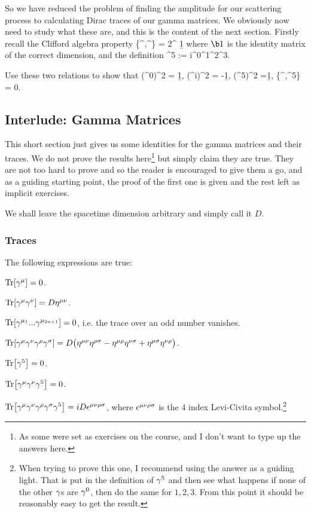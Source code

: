 So we have reduced the problem of finding the amplitude for our scattering process to calculating Dirac traces of our gamma matrices. We obviously now need to study what these are, and this is the content of the next section. Firstly recall the Clifford algebra property
\be 
\label{eqn:AnticommutationGammas}
    \{\g^{\mu},\g^{\nu}\} = 2\eta^{\mu\nu} \b1
\ee 
where $\b1$ is the identity matrix of the correct dimension, and the definition
\be 
\label{eqn:Gamma5}
    \g^5 := i\g^0\g^1\g^2\g^3.
\ee

\bbox 
    Use these two relations to show that 
    \bse 
        \big(\g^0\big)^2 = \b1, \qquad \big(\g^i\big)^2 = -\b1, \qquad \big(\g^5\big)^2 =\b1, \qand \big\{\g^{\mu},\g^5\big\} = 0.
    \ese 
\ebox 


\subsection{Interlude: Gamma Matrices}

This short section just gives us some identities for the gamma matrices and their traces. We do not prove the results here\footnote{As some were set as exercises on the course, and I don't want to type up the answers here.} but simply claim they are true. They are not too hard to prove and so the reader is encouraged to give them a go, and as a guiding starting point, the proof of the first one is given and the rest left as implicit exercises.

We shall leave the spacetime dimension arbitrary and simply call it $D$.

\subsubsection{Traces}

The following expressions are true:
\ben[label=(\roman*)]
    \item $\Tr [\gamma^{\mu}] = 0$.
    \item $\Tr [\gamma^{\mu}\gamma^{\nu}] = D \eta^{\mu\nu}$. 
    \item $\Tr[\gamma^{\mu_1}... \gamma^{\mu_{2n+1}}] = 0$, i.e. the trace over an odd number vanishes. 
    \item $\Tr [\gamma^{\mu}\gamma^{\nu}\gamma^{\rho}\gamma^{\sigma}] = D\big(\eta^{\mu\nu}\eta^{\rho\sigma} - \eta^{\mu\rho}\eta^{\nu\sigma} + \eta^{\mu\sigma}\eta^{\nu\rho}\big)$.
    \item $\Tr[\gamma^5]=0$. 
    \item $ \Tr[\gamma^{\mu}\gamma^{\nu}\gamma^5] = 0$. 
    \item $\Tr [\gamma^{\mu}\gamma^{\nu}\gamma^{\rho}\gamma^{\sigma}\gamma^5] = iD\epsilon^{\mu\nu\rho\sigma}$, where $\epsilon^{\mu\nu\rho\sigma}$ is the $4$ index Levi-Civita symbol.\footnote{When trying to prove this one, I recommend using the answer as a guiding light. That is put in the definition of $\gamma^5$ and then see what happens if none of the other $\gamma$s are $\gamma^0$, then do the same for $1,2,3$. From this point it should be reasonably easy to get the result.}
\een 


